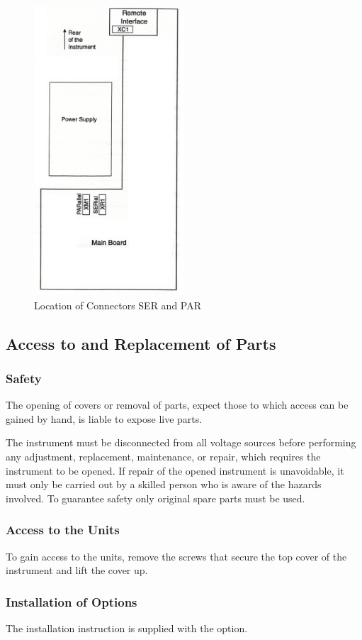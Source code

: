 \begin{figure}[hbt]
\centering
\includegraphics[width=0.5\textwidth]{fig/PT5300_overview}
\caption{Location of Connectors SER and PAR}
\label{serialconnector}
\end{figure}

\subsection{Access to and Replacement of Parts}
\subsubsection{Safety}
The opening of covers or removal of parts, expect those to which access can be gained by hand, is liable to expose live parts.

The instrument must be disconnected from all voltage sources before performing any adjustment, replacement, maintenance, or repair, which requires the instrument to be opened. If repair of the opened instrument is unavoidable, it must only be carried out by a skilled person who is aware of the hazards involved. To guarantee safety only original spare parts must be used.

\subsubsection{Access to the Units}
To gain access to the units, remove the screws that secure the top cover of the instrument and lift the cover up.

\subsubsection{Installation of Options}
The installation instruction is supplied with the option.